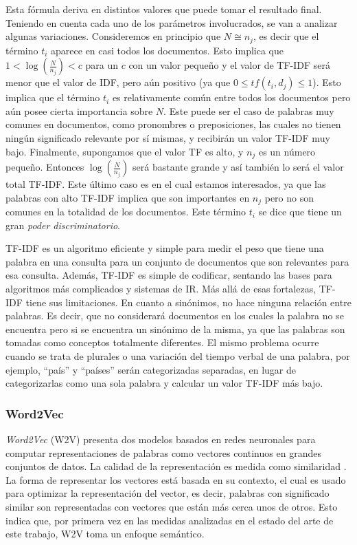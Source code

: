 Esta fórmula deriva en distintos valores que puede tomar el resultado final. Teniendo en cuenta cada uno de los parámetros involucrados, se van a analizar algunas variaciones. Consideremos en principio que \(N \cong n_j\), es decir que el término \(t_i\) aparece en casi todos los documentos. Esto implica que \(1 <  \log(\frac{N}{n_j}) < c \) para un \(c\) con un valor pequeño y el valor de TF-IDF será menor que el valor de IDF, pero aún positivo (ya que \(0 \leq tf(t_i,d_j) \leq 1\)). Esto implica que el término \(t_i\) es relativamente común entre todos los documentos pero aún posee cierta importancia sobre \(N\). Este puede ser el caso de palabras muy comunes en documentos, como pronombres o preposiciones, las cuales no tienen ningún significado relevante por sí mismas, y recibirán un valor TF-IDF muy bajo. Finalmente, supongamos que el valor TF es alto, y \(n_j\) es un número pequeño. Entonces \(\log(\frac{N}{n_j})\) será bastante grande y así también lo será el valor total TF-IDF. Este último caso es en el cual estamos interesados, ya que las palabras con alto TF-IDF implica que son importantes en \(n_j\) pero no son comunes en la totalidad de los documentos. Este término \(t_i\) se dice que tiene un gran \textit{poder discriminatorio}.

\bigskip TF-IDF es un algoritmo eficiente y simple para medir el peso que tiene una palabra en una consulta para un conjunto de documentos que son relevantes para esa consulta. Además, TF-IDF es simple de codificar, sentando las bases para algoritmos más complicados y sistemas de IR. Más allá de esas fortalezas, TF-IDF tiene sus limitaciones. En cuanto a sinónimos, no hace ninguna relación entre palabras. Es decir, que no considerará documentos en los cuales la palabra no se encuentra pero si se encuentra un sinónimo de la misma, ya que las palabras son tomadas como conceptos totalmente diferentes. El mismo problema ocurre cuando se trata de plurales o una variación del tiempo verbal de una palabra, por ejemplo, “país” y “países” serán categorizadas separadas, en lugar de categorizarlas como una sola palabra y calcular un valor TF-IDF más bajo.

\subsubsection{Word2Vec}
\textit{Word2Vec} (W2V) presenta dos modelos basados en redes neuronales para computar representaciones de palabras como vectores continuos en grandes conjuntos de datos. La calidad de la representación es medida como similaridad \citep{mikolov2013efficient}. La forma de representar los vectores está basada en su contexto, el cual es usado para optimizar la representación del vector, es decir, palabras con significado similar son representadas con vectores que están más cerca unos de otros. Esto indica que, por primera vez en las medidas analizadas en el estado del arte de este trabajo, W2V toma un enfoque semántico.

